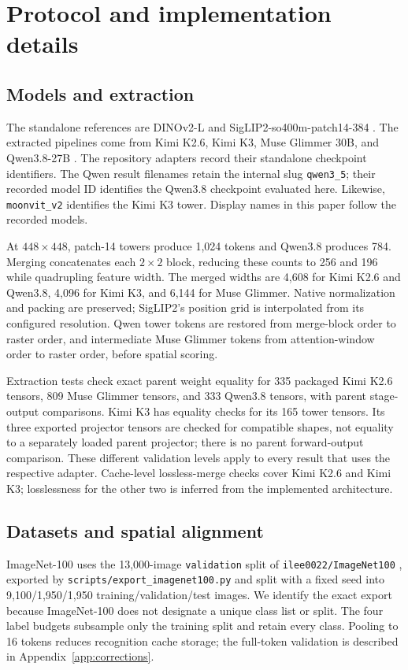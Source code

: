 \section{Protocol and implementation details}
\label{app:protocol}
\subsection{Models and extraction}
The standalone references are DINOv2-L \citep{oquab2024dinov2} and
SigLIP2-so400m-patch14-384 \citep{tschannen2025siglip2}. The extracted pipelines come
from Kimi K2.6, Kimi K3, Muse Glimmer 30B, and Qwen3.8-27B
\citep{moonshot2026kimik26,moonshot2026kimik3,meta2026museglimmer,qwen2026qwen38}.
The repository adapters record their standalone checkpoint identifiers. The Qwen
result filenames retain the internal slug \texttt{qwen3\_5}; their recorded model ID
identifies the Qwen3.8 checkpoint evaluated here. Likewise, \texttt{moonvit\_v2}
identifies the Kimi K3 tower. Display names in this paper follow the recorded models.

At $448\times448$, patch-14 towers produce 1,024 tokens and Qwen3.8 produces 784.
Merging concatenates each $2\times2$ block, reducing these counts to 256 and 196 while
quadrupling feature width. The merged widths are 4,608 for Kimi K2.6 and Qwen3.8,
4,096 for Kimi K3, and 6,144 for Muse Glimmer. Native normalization and packing are
preserved; SigLIP2's position grid is interpolated from its configured resolution.
Qwen tower tokens are restored from merge-block order to raster order, and intermediate
Muse Glimmer tokens from attention-window order to raster order, before spatial scoring.

Extraction tests check exact parent weight equality for 335 packaged Kimi K2.6 tensors,
809 Muse Glimmer tensors, and 333 Qwen3.8 tensors, with parent stage-output comparisons.
Kimi K3 has equality checks for its 165 tower tensors. Its three exported projector
tensors are checked for compatible shapes, not equality to a separately loaded parent
projector; there is no parent forward-output comparison. These different validation
levels apply to every result that uses the respective adapter. Cache-level lossless-merge
checks cover Kimi K2.6 and Kimi K3; losslessness for the other two is inferred from the
implemented architecture.

\subsection{Datasets and spatial alignment}
ImageNet-100 uses the 13,000-image \texttt{validation} split of
\texttt{ilee0022/ImageNet100} \citep{ilee0022imagenet100}, exported by
\texttt{scripts/export\_imagenet100.py} and split with a fixed seed into
9,100/1,950/1,950 training/validation/test images. We identify the exact export because
ImageNet-100 does not designate a unique class list or split. The four label budgets subsample only
the training split and retain every class. Pooling to 16 tokens reduces recognition
cache storage; the full-token validation is described in Appendix~\ref{app:corrections}.

